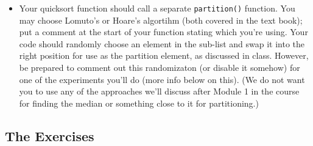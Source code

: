 \documentclass[11pt]{article}
\begin{document}
\begin{itemize}
	\item Your quicksort function should call a separate {\tt partition()} function. You may choose Lomuto's or Hoare's algortihm (both covered in the text book); put a comment at the start of your function stating which you're using.  Your code should randomly choose an element in the sub-list and swap it into the right position for use as the partition element, as discussed in class.  However, be prepared to comment out this randomizaton (or disable it somehow) for one of the experiments you'll do (more info below on this).  (We do not want you to use any of the approaches we'll discuss after Module 1 in the course for finding the median or something close to it for partitioning.)
	

\end{itemize}

\subsection*{The Exercises}
\end{document}
